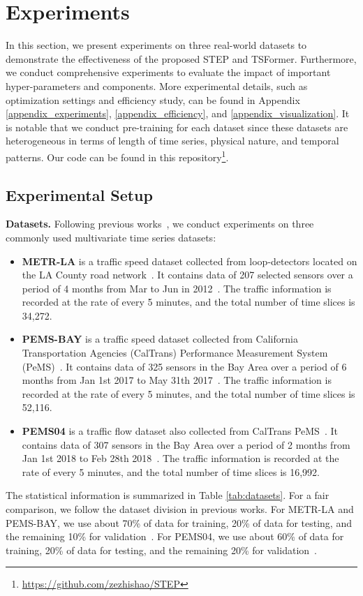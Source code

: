 \documentclass[sigconf]{acmart}
\begin{document}
 \section{Experiments}


In this section, we present experiments on three real-world datasets to demonstrate the effectiveness of the proposed STEP and TSFormer.
Furthermore, we conduct comprehensive experiments to evaluate the impact of important hyper-parameters and components.
More experimental details, such as optimization settings and efficiency study, can be found in Appendix \ref{appendix_experiments}, \ref{appendix_efficiency}, and \ref{appendix_visualization}.
It is notable that we conduct pre-training for each dataset since these datasets are heterogeneous in terms of length of time series, physical nature, and temporal patterns. 
Our code can be found in this repository\footnote{\url{https://github.com/zezhishao/STEP}}.

\subsection{Experimental Setup}
\noindent\textbf{Datasets.}
Following previous works~\cite{2021GTS, 2020MTGNN, GWNet}, we conduct experiments on three commonly used multivariate time series datasets:
\begin{itemize}
    \item \textbf{METR-LA} is a traffic speed dataset collected from loop-detectors located on the LA County road network~\cite{METR-LA}. 
    It contains data of 207 selected sensors over a period of 4 months from Mar to Jun in 2012~\cite{2017DCRNN}. 
    The traffic information is recorded at the rate of every 5 minutes, and the total number of time slices is 34,272.
    \item \textbf{PEMS-BAY} is a traffic speed dataset collected from California Transportation Agencies (CalTrans) Performance Measurement System (PeMS)~\cite{PEMS-BAY}.
    It contains data of 325 sensors in the Bay Area over a period of 6 months from Jan 1st 2017 to May 31th 2017~\cite{2017DCRNN}.
    The traffic information is recorded at the rate of every 5 minutes, and the total number of time slices is 52,116.
    \item \textbf{PEMS04} is a traffic flow dataset also collected from CalTrans PeMS~\cite{PEMS-BAY}.
    It contains data of 307 sensors in the Bay Area over a period of 2 months from Jan 1st 2018 to Feb 28th 2018~\cite{2019ASTGCN}.
    The traffic information is recorded at the rate of every 5 minutes, and the total number of time slices is 16,992.
    
\end{itemize}
The statistical information is summarized in Table \ref{tab:datasets}.
For a fair comparison, we follow the dataset division in previous works.
For METR-LA and PEMS-BAY, we use about 70\% of data for training, 20\% of data for testing, and the remaining 10\% for validation~\cite{2017DCRNN, GWNet}.
For PEMS04, we use about 60\% of data for training, 20\% of data for testing, and the remaining 20\% for validation~\cite{2021ASTGNN, 2019ASTGCN}.
\end{document}
